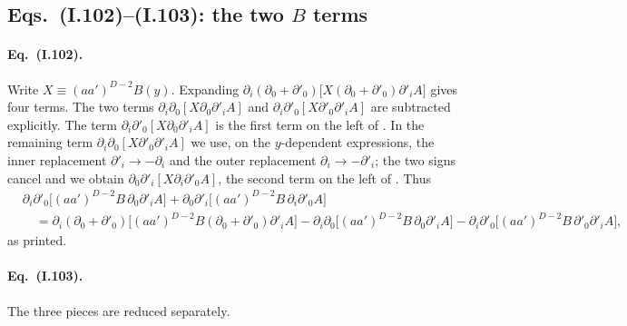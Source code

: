\subsection{Eqs.~(I.102)--(I.103): the two \texorpdfstring{$B$}{B} terms \texorpdfstring{\tD}{}}
\label{ch6:102-103}

\paragraph{Eq.~(I.102).} Write $X\equiv(aa')^{D-2}B(y)$. Expanding $\partial_i(\partial_0+\partial'_0)\big[X(\partial_0+\partial'_0)\partial'_iA\big]$
gives four terms. The two terms $\partial_i\partial_0[X\partial_0\partial'_iA]$ and $\partial_i\partial'_0[X\partial'_0\partial'_iA]$ are subtracted
explicitly. The term $\partial_i\partial'_0[X\partial_0\partial'_iA]$ is the first term on the left of . In the remaining term
$\partial_i\partial_0[X\partial'_0\partial'_iA]$ we use, on the $y$-dependent expressions, the inner replacement $\partial'_i\to-\partial_i$ and the outer
replacement $\partial_i\to-\partial'_i$; the two signs cancel and we obtain $\partial_0\partial'_i[X\partial_i\partial'_0A]$, the second term on the left of
. Thus
\begin{equation}
\begin{split}
&\partial_i\partial'_0\big[(aa')^{D-2}B\,\partial_0\partial'_iA\big]+\partial_0\partial'_i\big[(aa')^{D-2}B\,\partial_i\partial'_0A\big]\\
&\quad=\partial_i(\partial_0+\partial'_0)\big[(aa')^{D-2}B(\partial_0+\partial'_0)\partial'_iA\big]
-\partial_i\partial_0\big[(aa')^{D-2}B\,\partial_0\partial'_iA\big]-\partial_i\partial'_0\big[(aa')^{D-2}B\,\partial'_0\partial'_iA\big],
\end{split}\tag{I.102}
\end{equation}
as printed.

\paragraph{Eq.~(I.103).} The three pieces are reduced separately.

